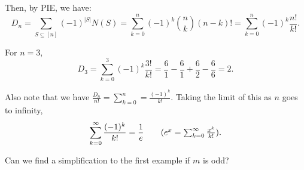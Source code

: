 Then, by PIE, we have: \[
	D_n = \sum_{S \subseteq [n]}(-1)^{|S|}N(S) = \sum_{k=0}^{n}(-1)^k\binom{n}{k}(n-k)! = \sum_{k=0}^{n}(-1)^k\frac{n!}{k!}
.\]

\begin{eg}
	For \( n=3 \), \[
		D_3 = \sum_{k=0}^{3}(-1)^k \frac{3!}{k!} = \frac{6}{1} - \frac{6}{1} + \frac{6}{2} - \frac{6}{6} = 2
	.\] 
\end{eg}

Also note that we have \( \frac{D_n}{n!} = \sum_{k=0}^{n} = \frac{(-1)^k}{k!} \). Taking the limit of this as \( n \) goes to infinity, 
\begin{align*}
	\sum_{k=0}^{\infty}\frac{(-1)^k}{k!} = \frac{1}{e} \tag{\( e^x=\sum_{k=0}^{\infty} \frac{x^k}{k!} \)}
.\end{align*}

Can we find a simplification to the first example if \( m \) is odd?
